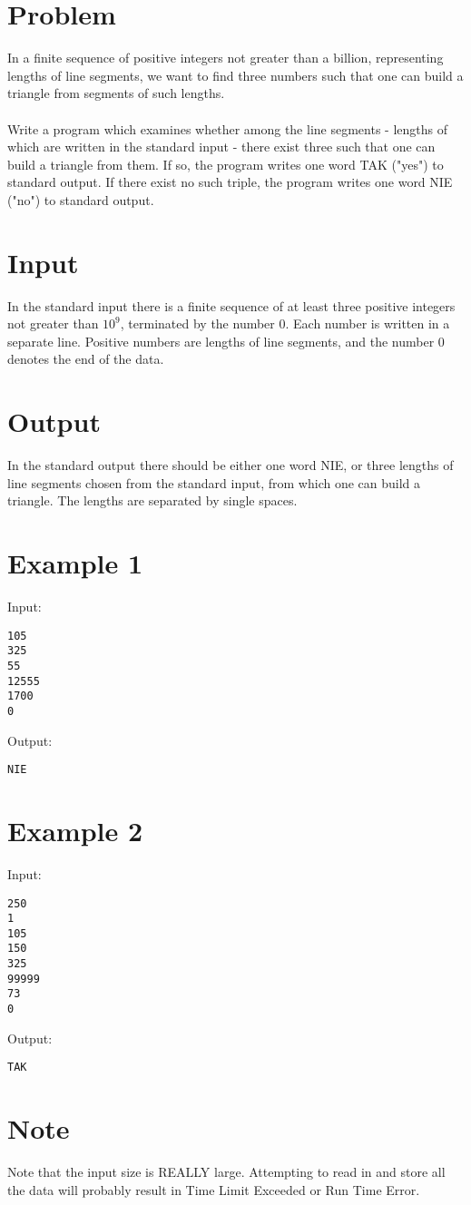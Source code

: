 \documentclass[11pt]{article}
\begin{document}
\section*{Problem}
In a finite sequence of positive integers not greater than a billion,
representing lengths of line segments, we want to find three numbers such that
one can build a triangle from segments of such lengths.
\\\\
Write a program which examines whether among the line segments - lengths of
which are written in the standard input - there exist three such that one can
build a triangle from them. If so, the program writes one word TAK ("yes") to
standard output. If there exist no such triple, the program writes one word NIE
("no") to standard output.
\section*{Input}
In the standard input there is a finite sequence of at least three positive
integers not greater than $10^9$, terminated by the number $0$. Each number is
written in a separate line. Positive numbers are lengths of line segments, and
the number $0$ denotes the end of the data.
\section*{Output}
In the standard output there should be either one word NIE, or three lengths of
line segments chosen from the standard input, from which one can build a
triangle. The lengths are separated by single spaces.
\section*{Example 1}
Input:

\begin{verbatim}
105
325
55
12555
1700
0
\end{verbatim}

\noindent Output:

\begin{verbatim}
NIE
\end{verbatim}
\section*{Example 2}
Input:

\begin{verbatim}
250
1
105
150
325
99999
73
0
\end{verbatim}

\noindent Output:

\begin{verbatim}
TAK
\end{verbatim}

\section*{Note}

Note that the input size is REALLY large. Attempting to read in and store all the data will probably result in Time Limit Exceeded or Run Time Error.
\end{document}
